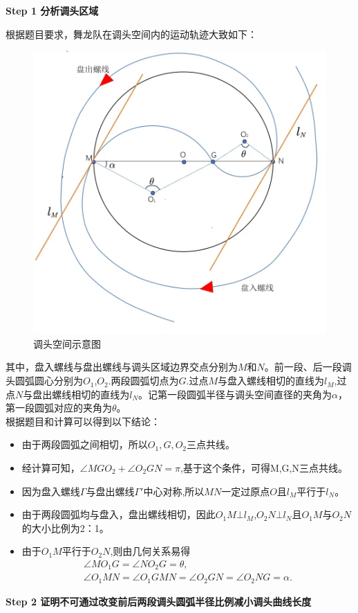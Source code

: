 \documentclass[../main.tex]{subfiles}
\begin{document}
\noindent\textbf{Step 1 分析调头区域}
\par 根据题目要求，舞龙队在调头空间内的运动轨迹大致如下：
\begin{figure}[H]
    \centering
    \includegraphics[width=.6\textwidth]{woshiren}
    \caption{调头空间示意图}
  \label{2.2.2.2.2.2} 
\end{figure}
\par 其中，盘入螺线与盘出螺线与调头区域边界交点分别为$M$和$N$。前一段、后一段调头圆弧圆心分别为$O_1$,$O_2$.两段圆弧切点为$G$.过点$M$与盘入螺线相切的直线为$l_M$,过点$N$与盘出螺线相切的直线为$l_N$。记第一段圆弧半径与调头空间直径的夹角为$\alpha $，第一段圆弧对应的夹角为$\theta $。
\\ 根据题目和计算可以得到以下结论：
\begin{itemize}
    \item  由于两段圆弧之间相切，所以$O_1,G,O_2$三点共线。
    \item  经计算可知，$\angle MGO_2+\angle O_2GN=\pi $,基于这个条件，可得M,G,N三点共线。
    \item  因为盘入螺线$\varGamma$与盘出螺线$\varGamma'$中心对称,所以$MN$一定过原点$O$且$l_M$平行于$ l_N$。
    \item  由于两段圆弧均与盘入，盘出螺线相切，因此$O_1M\bot l_M${,}$O_2N\bot l_N$且$O_1M$与$O_2N$的大小比例为2：1。
    \item  由于$O_1M $平行于$ O_2N$,则由几何关系易得
\begin{gather}
\angle MO_1G=\angle NO_2G=\theta,\label{1.........33}
\\
\angle O_1MN=\angle O_1GMN=\angle O_2GN=\angle O_2NG=\alpha .\label{1.........34}
\end{gather}
    \end{itemize} 
    \noindent\textbf{Step 2 证明不可通过改变前后两段调头圆弧半径比例减小调头曲线长度} 
\end{document}
